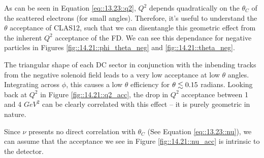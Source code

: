     As can be seen in Equation \eqref{eq::13.23::q2}, $Q^2$ depends quadratically on the $\theta_C$ of the scattered electrons (for small angles).
    Therefore, it's useful to understand the $\theta$ acceptance of CLAS12, such that we can disentangle this geometric effect from the inherent $Q^2$ acceptance of the FD.
    We can see this dependance for negative particles in Figures \ref{fig::14.21::phi_theta_neg} and \ref{fig::14.21::theta_neg}.

    The triangular shape of each DC sector in conjunction with the inbending tracks from the negative solenoid field leads to a very low acceptance at low $\theta$ angles.
    Integrating across $\phi$, this causes a low $\theta$ efficiency for $\theta \lesssim 0.15$ radians.
    Looking back at $Q^2$ in Figure \ref{fig::14.21::q2_acc}, the drop in $Q^2$ acceptance between 1 and 4 $GeV^2$ can be clearly correlated with this effect -- it is purely geometric in nature.

    Since $\nu$ presents no direct correlation with $\theta_C$ (See Equation \eqref{eq::13.23::nu}), we can assume that the acceptance we see in Figure \ref{fig::14.21::nu_acc} is intrinsic to the detector.
